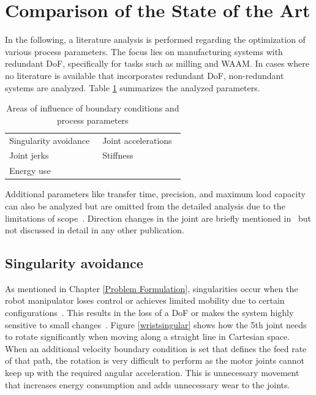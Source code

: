 \section{Comparison of the State of the Art }\label{comp}

In the following, a literature analysis is performed regarding the optimization of various process parameters. The focus lies on manufacturing systems with redundant DoF, specifically for tasks such as milling and WAAM. In cases where no literature is available that incorporates redundant DoF, non-redundant systems are analyzed.
Table \ref{parameter} summarizes the analyzed parameters. 


\begin{table} [H]
	\centering
	\begin{tabular}{|l|l|}
		\hline
		\hline
		Singularity avoidance~\cite{Huo.2008} & Joint accelerations~\cite{Gasparetto.2010}\\
		Joint jerks~\cite{Gasparetto.2010} & Stiffness~\cite{Cvitanic.2020} \\
		Energy use~\cite{Paryanto.2015} & \\
		\hline
		\hline
		
	\end{tabular}
	
	
	\caption{Areas of influence of boundary conditions and process parameters}
	\label{parameter}
\end{table}

Additional parameters like transfer time, precision, and maximum load capacity can also be analyzed but are omitted from the detailed analysis due to the limitations of scope~\cite{Breaz.2017, Hirzinger.2005, Pham.2018}. Direction changes in the joint are briefly mentioned in~\cite{Halbauer.2013} but not discussed in detail in any other publication.

\subsection{Singularity avoidance}\label{Singularity avoidance}
As mentioned in Chapter \ref{Problem Formulation}, singularities occur when the robot manipulator loses control or achieves limited mobility due to certain configurations~\cite{Malyshev.2022}. This results in the loss of a DoF or makes the system highly sensitive to small changes~\cite{Zhao.2021, Milenkovic.2021}.
Figure \ref{wristsingular} shows how the 5th joint needs to rotate significantly when moving along a straight line in Cartesian space. When an additional velocity boundary condition is set that defines the feed rate of that path, the rotation is very difficult to perform as the motor joints cannot keep up with the required angular acceleration. This is unnecessary movement that increases energy consumption and adds unnecessary wear to the joints. 



